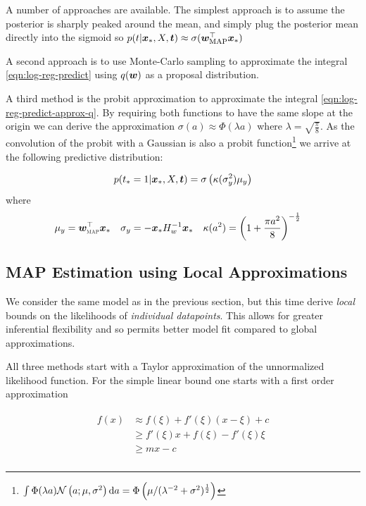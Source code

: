 A number of approaches are available. The simplest approach is to assume the posterior is sharply peaked around the mean, and simply plug the posterior mean directly into the sigmoid so $p(t|\bm x_*, X, \bm t) \approx \sigma(\bm w_{\text{MAP}}^\top \bm x_*)$

A second approach is to use Monte-Carlo sampling to approximate the integral \eqref{eqn:log-reg-predict} using $q(\bm w)$ as a proposal distribution.

A third method is the probit approximation\cite{Barber1998} to approximate the integral \eqref{eqn:log-reg-predict-approx-q}. By requiring both functions to have the same slope at the origin we can derive the approximation $\sigma(a) \approx \Phi(\lambda a)$ where $\lambda = \sqrt{\frac{\pi}{8}}$. As the convolution of the probit with a Gaussian is also a probit function\footnote{$\int \Phi(\lambda a)\mathcal{N} \left(a; \mu, \sigma^2\right) \text{d}a = \Phi\left(\mu / (\lambda^{-2} + \sigma^2)^{\frac{1}{2}} \right)$} we arrive at the following predictive distribution:


\begin{align}
p(t_* = 1 | \bm x_*, X, \bm t) = \sigma\left( \kappa(\sigma_y^2) \mu_y \right)
\end{align}
where
\begin{align}
\mu_y       & = \bm w_{\text{\tiny \sc MAP}}^\top\bm x_* &
\sigma_y    & = -\bm x_* {H}^{-1}_{w} \bm x_* &
\kappa(a^2) & = \left( 1 + \frac{\pi a^2}{8}  \right)^{-\frac{1}{2}}
\end{align}

\subsection*{MAP Estimation using Local Approximations}

We consider the same model as in the previous section, but this time derive \emph{local} bounds on the likelihoods of \emph{individual datapoints}. This allows for greater inferential flexibility and so permits better model fit compared to global approximations\cite{Jaakkola1997}.

All three methods start with a Taylor approximation of the unnormalized likelihood function. For the simple linear bound one starts with a first order approximation

\begin{align}
\begin{split}
f(x) & \approx f(\xi) + f'(\xi) (x - \xi) + c \\
 & \geq f'(\xi) x + f(\xi) - f'(\xi)\xi \\
 & \geq m x - c \\
\end{split}
\end{align}

